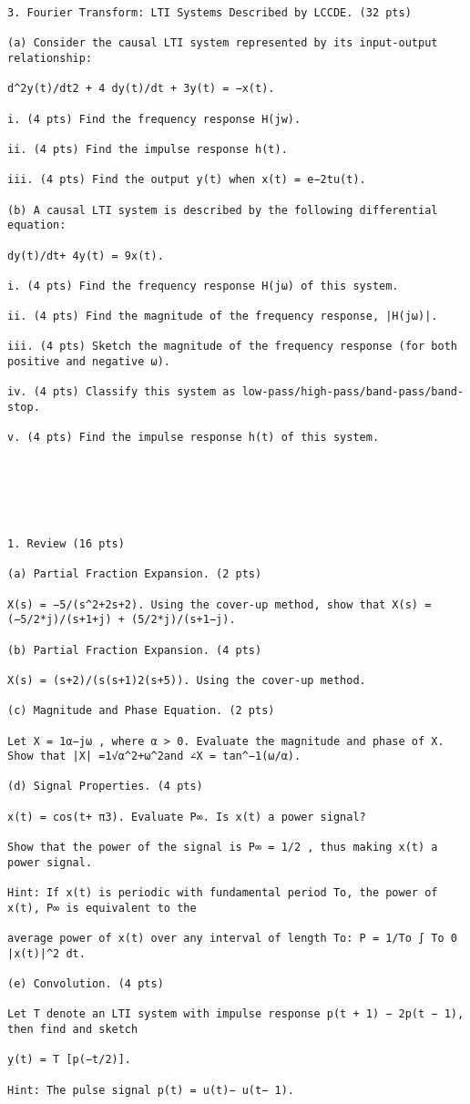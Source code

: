 \documentclass[11pt,addpoints]{exam}
\begin{document}
\begin{verbatim}
3. Fourier Transform: LTI Systems Described by LCCDE. (32 pts)

(a) Consider the causal LTI system represented by its input-output relationship:

d^2y(t)/dt2 + 4 dy(t)/dt + 3y(t) = −x(t).

i. (4 pts) Find the frequency response H(jw).

ii. (4 pts) Find the impulse response h(t).

iii. (4 pts) Find the output y(t) when x(t) = e−2tu(t).

(b) A causal LTI system is described by the following differential equation:

dy(t)/dt+ 4y(t) = 9x(t).

i. (4 pts) Find the frequency response H(jω) of this system.

ii. (4 pts) Find the magnitude of the frequency response, |H(jω)|.

iii. (4 pts) Sketch the magnitude of the frequency response (for both positive and negative ω).

iv. (4 pts) Classify this system as low-pass/high-pass/band-pass/band-stop.

v. (4 pts) Find the impulse response h(t) of this system.






1. Review (16 pts)

(a) Partial Fraction Expansion. (2 pts)

X(s) = −5/(s^2+2s+2). Using the cover-up method, show that X(s) = (−5/2*j)/(s+1+j) + (5/2*j)/(s+1−j).

(b) Partial Fraction Expansion. (4 pts)

X(s) = (s+2)/(s(s+1)2(s+5)). Using the cover-up method.

(c) Magnitude and Phase Equation. (2 pts)

Let X = 1α−jω , where α > 0. Evaluate the magnitude and phase of X. Show that |X| =1√α^2+ω^2and ∠X = tan^−1(ω/α).

(d) Signal Properties. (4 pts)

x(t) = cos(t+ π3). Evaluate P∞. Is x(t) a power signal?

Show that the power of the signal is P∞ = 1/2 , thus making x(t) a power signal.

Hint: If x(t) is periodic with fundamental period To, the power of x(t), P∞ is equivalent to the

average power of x(t) over any interval of length To: P = 1/To ∫ To 0 |x(t)|^2 dt.

(e) Convolution. (4 pts)

Let T denote an LTI system with impulse response p(t + 1) − 2p(t − 1), then find and sketch

y(t) = T [p(−t/2)].

Hint: The pulse signal p(t) = u(t)− u(t− 1).






\end{verbatim}
\end{document}
